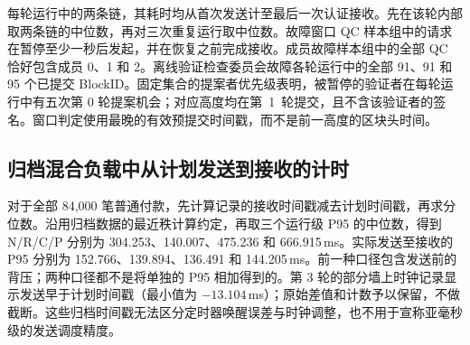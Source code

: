 每轮运行中的两条链，其耗时均从首次发送计至最后一次认证接收。先在该轮内部取两条链的中位数，再对三次重复运行取中位数。故障窗口 QC 样本组中的请求在暂停至少一秒后发起，并在恢复之前完成接收。成员故障样本组中的全部 QC 恰好包含成员 0、1 和 2。离线验证检查委员会故障各轮运行中的全部 91、91 和 95 个已提交 BlockID。固定集合的提案者优先级表明，被暂停的验证者在每轮运行中有五次第 0 轮提案机会；对应高度均在第~1~轮提交，且不含该验证者的签名。窗口判定使用最晚的有效预提交时间戳，而不是前一高度的区块头时间。

\subsection{归档混合负载中从计划发送到接收的计时}
对于全部 84,000 笔普通付款，先计算记录的接收时间戳减去计划时间戳，再求分位数。沿用归档数据的最近秩计算约定，再取三个运行级 P95 的中位数，得到 N/R/C/P 分别为 304.253、140.007、475.236 和 666.915\,ms。实际发送至接收的 P95 分别为 152.766、139.894、136.491 和 144.205\,ms。前一种口径包含发送前的背压；两种口径都不是将单独的 P95 相加得到的。第 3 轮的部分墙上时钟记录显示发送早于计划时间戳（最小值为 $-13.104$\,ms）；原始差值和计数予以保留，不做截断。这些归档时间戳无法区分定时器唤醒误差与时钟调整，也不用于宣称亚毫秒级的发送调度精度。
